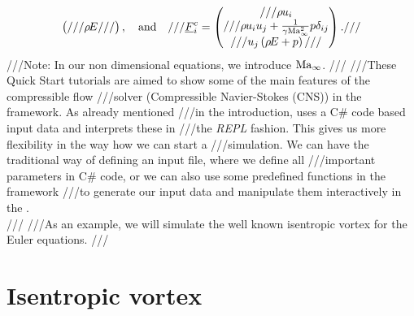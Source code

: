 {\begin{align*}
\begin{pmatrix}
///  \energy{}
///\end{pmatrix}, \quad \textrm{and} \quad
///\vec{F}^c_i = \begin{pmatrix}
///  \momentum_i\\
///  \momentum_i \velocity_j + \frac{1}{\heatCapacityRatio \reference{\Mach}^2}\pressure \delta_{ij}\\
///  \velocity_j \left(\energy{}+\pressure{}\right)
///\end{pmatrix}.
///\end{align*}
///Note: In our non dimensional equations, we introduce ${\mathrm{Ma}}_{\infty}$. 
///
///These Quick Start tutorials are aimed to show some of the main features of the compressible flow 
///solver (Compressible Navier-Stokes (CNS)) in the \BoSSS{} framework. As already mentioned 
///in the introduction, \BoSSS{} uses a C\# code based input data and interprets these in 
///the \emph{REPL} fashion. This gives us more flexibility in the way how we can start a 
///simulation. We can have the traditional way of defining an input file, where we define all 
///important parameters in C\# code, or we can also use some predefined functions in the framework 
///to generate our input data and manipulate them interactively in the \BoSSSpad{}.\\ 
///
///As an example, we will simulate the well known isentropic vortex for the Euler equations. 
///\section{Isentropic vortex}
 }
\BoSSSexeSilent
{}
\BoSSSexeSilent
{}
\BoSSSexe
{}
\BoSSSexe
{}
\BoSSSexe
{}
\BoSSSexe
